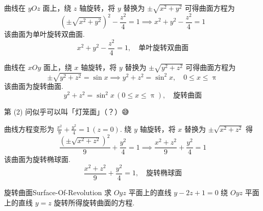 \begin{solution}

    曲线在 $yOz$ 面上，绕 $z$ 轴旋转，将 $y$ 替换为 $\pm \sqrt{x^2 + y^2}$ 可得曲面方程为
    \begin{equation}
        (\pm \sqrt{x^2 + y^2})^2 - \frac{z^2}{4} = 1 \implies x^2 + y^2 - \frac{z^2}{4} = 1
    \end{equation}
    该曲面为单叶旋转双曲面.
    \begin{equation}
        \boxed{x^2 + y^2 - \frac{z^2}{4} = 1, \quad \text{单叶旋转双曲面}}
    \end{equation}


    曲线在 $xOy$ 面上，绕 $x$ 轴旋转，将 $y$ 替换为 $\pm \sqrt{y^2 + z^2}$ 可得曲面方程为
    \begin{equation}
        \pm \sqrt{y^2 + z^2} = \sin x \implies y^2 + z^2 = \sin^2 x, \quad 0 \le x \le \uppi
    \end{equation}
    该曲面为旋转曲面.
    \begin{equation}
        \boxed{y^2 + z^2 = \sin^2 x \, (0 \le x \le \uppi), \quad \text{旋转曲面}}
    \end{equation}

    \begin{note}{}{}
        第 (2) 问似乎可以叫「灯笼面」（？）{\emojifont 😅}
    \end{note}


    曲线方程变形为 $\frac{x^2}{9} + \frac{y^2}{4} = 1 \, (z=0)$. 绕 $y$ 轴旋转，将 $x$ 替换为 $\pm \sqrt{x^2 + z^2}$ 得
    \begin{equation}
        \frac{(\pm \sqrt{x^2 + z^2})^2}{9} + \frac{y^2}{4} = 1 \implies \frac{x^2 + z^2}{9} + \frac{y^2}{4} = 1
    \end{equation}
    该曲面为旋转椭球面.
    \begin{equation}
        \boxed{\frac{x^2 + z^2}{9} + \frac{y^2}{4} = 1, \quad \text{旋转椭球面}}
    \end{equation}
\end{solution}


\begin{problem}{旋转曲面}{Surface-Of-Revolution}
    求 $Oyz$ 平面上的直线 $y - 2z + 1 = 0$ 绕 $Oyz$ 平面上的直线 $y = z$ 旋转所得旋转曲面的方程.
\end{problem}

